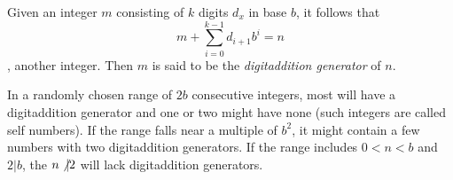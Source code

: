 \documentclass[12pt]{article}
\begin{document}
Given an integer $m$ consisting of $k$ digits $d_x$ in base $b$, it follows that $$m + \sum_{i = 0}^{k - 1} d_{i + 1}b^i = n$$, another integer. Then $m$ is said to be the {\em digitaddition generator} of $n$.

In a randomly chosen range of $2b$ consecutive integers, most will have a digitaddition generator and one or two might have none (such integers are called self numbers). If the range falls near a multiple of $b^2$, it might contain a few numbers with two digitaddition generators. If the range includes $0 < n < b$ and $2|b$, the $n \not\vert 2$ will lack digitaddition generators.
\end{document}
